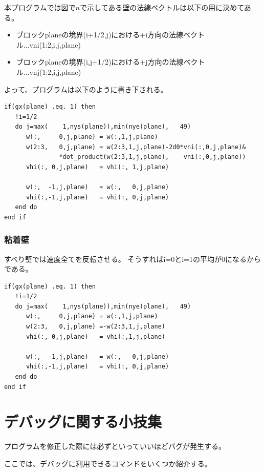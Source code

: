 \documentclass{jsarticle}
\begin{document}
本プログラムでは図で$n$で示してある壁の法線ベクトルは以下の用に決めてある。
\begin{itemize}
\item ブロックplaneの境界(i+1/2,j)における+i方向の法線ベクトル...vni(1:2,i,j,plane)
\item ブロックplaneの境界(i,j+1/2)における+j方向の法線ベクトル...vnj(1:2,i,j,plane)
\end{itemize}
よって、プログラムは以下のように書き下される。
\begin{verbatim}
if(gx(plane) .eq. 1) then
   !i=1/2
   do j=max(    1,nys(plane)),min(nye(plane),   49)
      w(:,     0,j,plane) = w(:,1,j,plane)
      w(2:3,   0,j,plane) = w(2:3,1,j,plane)-2d0*vni(:,0,j,plane)&
               *dot_product(w(2:3,1,j,plane),    vni(:,0,j,plane))
      vhi(:, 0,j,plane)   = vhi(:, 1,j,plane) 

      w(:,  -1,j,plane)   = w(:,   0,j,plane) 
      vhi(:,-1,j,plane)   = vhi(:, 0,j,plane) 
   end do
end if
\end{verbatim}
\subsubsection{粘着壁}%
すべり壁では速度全てを反転させる。
そうすればi=0とi=1の平均が0になるからである。

\begin{verbatim}
if(gx(plane) .eq. 1) then
   !i=1/2
   do j=max(    1,nys(plane)),min(nye(plane),   49)
      w(:,     0,j,plane) = w(:,1,j,plane)
      w(2:3,   0,j,plane) =-w(2:3,1,j,plane)
      vhi(:, 0,j,plane)   = vhi(:,1,j,plane) 

      w(:,  -1,j,plane)   = w(:,   0,j,plane) 
      vhi(:,-1,j,plane)   = vhi(:, 0,j,plane) 
   end do
end if
\end{verbatim}

\newpage
\section{デバッグに関する小技集}%
プログラムを修正した際には必ずといっていいほどバグが発生する。

ここでは、デバッグに利用できるコマンドをいくつか紹介する。
\end{document}
